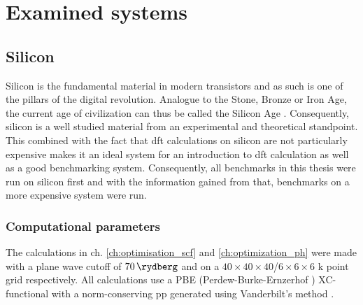 \documentclass[main.tex]{subfiles}
\begin{document}
\chapter{Examined systems}\label{ch:examined_systems}

\section{Silicon}\label{sec:systems_silicon}

Silicon is the fundamental material in modern transistors and as such is one of the pillars of the digital revolution.
Analogue to the Stone, Bronze or Iron Age, the current age of civilization can thus be called the Silicon Age \cite{chabal_fundamental_2001}.
Consequently, silicon is a well studied material from an experimental and theoretical standpoint.
This combined with the fact that \acrshort{dft} calculations on silicon are not particularly expensive makes it an ideal system for an introduction to \acrshort{dft} calculation as well as a good benchmarking system.
Consequently, all benchmarks in this thesis were run on silicon first and with the information gained from that, benchmarks on a more expensive system were run.



\subsection{Computational parameters}

The calculations in ch. \ref{ch:optimisation_scf} and \ref{ch:optimization_ph} were made with a plane wave cutoff of \(\SI{70}{\rydberg}\) and on a \(40\times40\times40\)/\(6\times6\times6\) k point grid respectively.
All calculations use a PBE (Perdew-Burke-Ernzerhof \cite{perdew_generalized_1996}) XC-functional with a norm-conserving \acrshort{pp} generated using Vanderbilt's method \cite{hamann_erratum_2017}.

\section{\TaS}\label{sec:systems_tas2}
\end{document}
